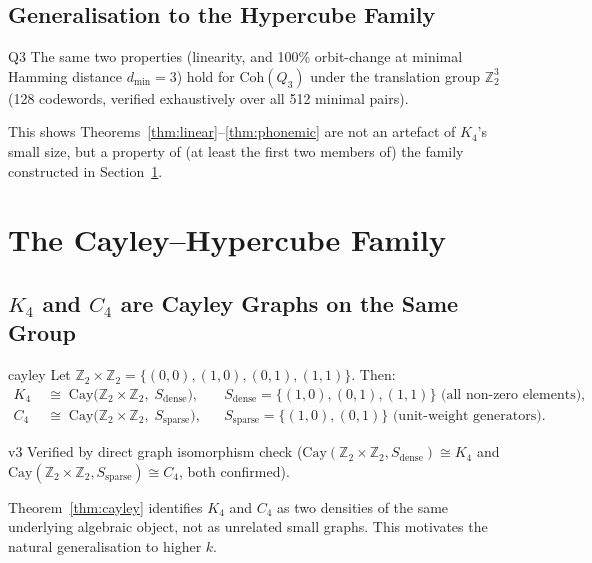 \documentclass[11pt,a4paper]{article}
\newcommand{\Kfour}{K_4}
\newcommand{\Coh}{\mathrm{Coh}}
\newcommand{\Zsub}{\mathbb{Z}_2}
\begin{document}
\subsection{Generalisation to the Hypercube Family}
\label{sec:generalisation}

\begin{theorembox}{}{Q3}
The same two properties (linearity, and 100\% orbit-change at minimal Hamming distance $d_{\min}=3$) hold for $\Coh(Q_3)$ under the translation group $\Zsub^3$ (128 codewords, verified exhaustively over all 512 minimal pairs).
\end{theorembox}

This shows Theorems~\ref{thm:linear}--\ref{thm:phonemic} are not an artefact of $\Kfour$'s small size, but a property of (at least the first two members of) the family constructed in Section~\ref{sec:cayley}.

\section{The Cayley--Hypercube Family}
\label{sec:cayley}

\subsection{\texorpdfstring{$K_4$}{K4} and \texorpdfstring{$C_4$}{C4} are Cayley Graphs on the Same Group}

\begin{theorembox}{}{cayley}
Let $\Zsub\times\Zsub=\{(0,0),(1,0),(0,1),(1,1)\}$. Then:
\begin{align}
\Kfour &\;\cong\; \mathrm{Cay}\bigl(\Zsub\times\Zsub,\; S_{\mathrm{dense}}\bigr), && S_{\mathrm{dense}}=\{(1,0),(0,1),(1,1)\} \text{ (all non-zero elements)},\\
C_4 &\;\cong\; \mathrm{Cay}\bigl(\Zsub\times\Zsub,\; S_{\mathrm{sparse}}\bigr), && S_{\mathrm{sparse}}=\{(1,0),(0,1)\} \text{ (unit-weight generators)}.
\end{align}
\end{theorembox}

\begin{verifbox}{}{v3}
Verified by direct graph isomorphism check ($\mathrm{Cay}(\Zsub\times\Zsub,S_{\mathrm{dense}})\cong\Kfour$ and $\mathrm{Cay}(\Zsub\times\Zsub,S_{\mathrm{sparse}})\cong C_4$, both confirmed).
\end{verifbox}

Theorem~\ref{thm:cayley} identifies $\Kfour$ and $C_4$ as two densities of the same underlying algebraic object, not as unrelated small graphs. This motivates the natural generalisation to higher $k$.
\end{document}

